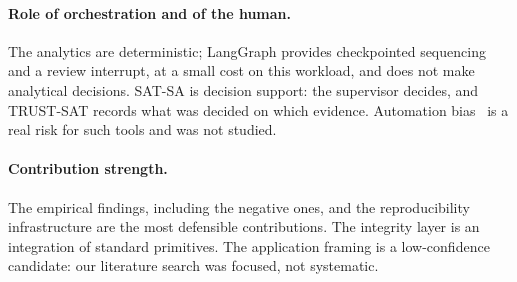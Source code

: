 \paragraph{Role of orchestration and of the human.}
The analytics are deterministic; LangGraph provides checkpointed sequencing and a
review interrupt, at a small cost on this workload, and does not make analytical
decisions. SAT-SA is decision support: the supervisor decides, and TRUST-SAT records
what was decided on which evidence. Automation bias~\citep{parasuraman2010automation}
is a real risk for such tools and was not studied.

\paragraph{Contribution strength.}
The empirical findings, including the negative ones, and the reproducibility
infrastructure are the most defensible contributions. The integrity layer is an
integration of standard primitives. The application framing is a low-confidence
candidate: our literature search was focused, not systematic.
